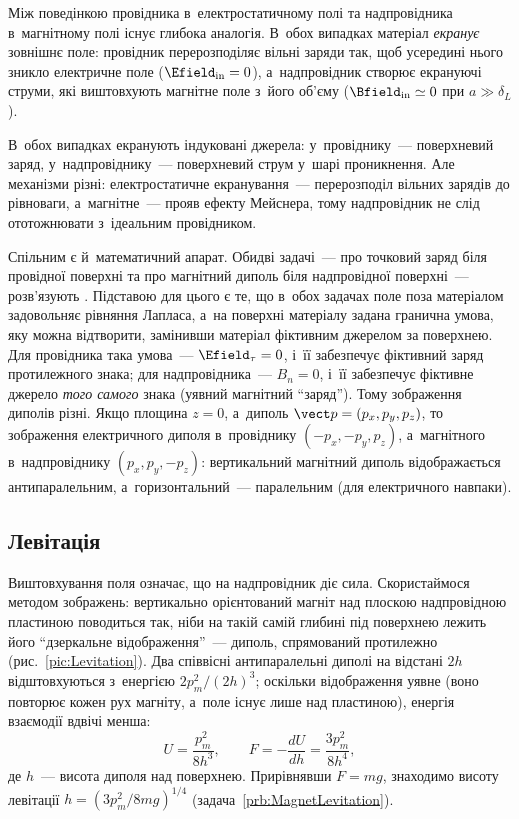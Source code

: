 Між поведінкою провідника в~електростатичному полі та надпровідника в~магнітному полі
існує глибока аналогія. В~обох випадках матеріал \emph{екранує} зовнішнє поле: провідник
перерозподіляє вільні заряди так, щоб усередині нього зникло електричне поле ($\Efield_\text{in}=0$),
а~надпровідник створює екрануючі струми, які виштовхують магнітне поле з~його об'єму ($\Bfield_\text{in}\simeq0$ при $a\gg\delta_L$).

В~обох випадках екранують індуковані джерела: у~провіднику~--- поверхневий заряд, у~надпровіднику~--- поверхневий струм у~шарі проникнення.
Але механізми різні: електростатичне екранування~--- перерозподіл вільних зарядів до рівноваги, а~магнітне~--- прояв ефекту Мейснера,
тому надпровідник не слід ототожнювати з~ідеальним провідником.

Спільним є й~математичний апарат. Обидві задачі~--- про точковий заряд біля провідної
поверхні та про магнітний диполь біля надпровідної поверхні~--- розв'язують
. Підставою для цього є те, що в~обох задачах поле поза
матеріалом задовольняє рівняння Лапласа, а~на поверхні матеріалу задана гранична
умова, яку можна відтворити, замінивши матеріал фіктивним джерелом за поверхнею. Для
провідника така умова~--- $\Efield_\tau=0$, і~її забезпечує фіктивний заряд
протилежного знака; для надпровідника~--- $B_n=0$, і~її забезпечує фіктивне джерело
\emph{того самого} знака (уявний магнітний \enquote{заряд}). Тому зображення диполів різні.
Якщо площина $z=0$, а~диполь $\vect p=(p_x,p_y,p_z)$, то зображення електричного диполя
в~провіднику $(-p_x,-p_y,p_z)$, а~магнітного в~надпровіднику $(p_x,p_y,-p_z)$:
вертикальний магнітний диполь відображається антипаралельним, а~горизонтальний~--- паралельним
(для електричного навпаки).

\subsection*{Левітація}

Виштовхування поля означає, що на надпровідник діє сила. Скористаймося методом зображень:
вертикально орієнтований магніт над плоскою надпровідною пластиною поводиться так, ніби
на такій самій глибині під поверхнею лежить його \enquote{дзеркальне відображення}~---
диполь, спрямований протилежно (рис.~\ref{pic:Levitation}). Два співвісні антипаралельні диполі на відстані $2h$
відштовхуються з~енергією $2p_m^2/(2h)^3$; оскільки відображення уявне (воно повторює
кожен рух магніту, а~поле існує лише над пластиною), енергія взаємодії вдвічі менша:
\begin{equation}\label{eq:LevitationForce}
	U=\frac{p_m^2}{8h^3},\qquad F=-\frac{dU}{dh}=\frac{3p_m^2}{8h^4},
\end{equation}
де $h$~--- висота диполя над поверхнею. Прирівнявши $F=mg$, знаходимо висоту левітації
$h=(3p_m^2/8mg)^{1/4}$ (задача~\ref{prb:MagnetLevitation}).

